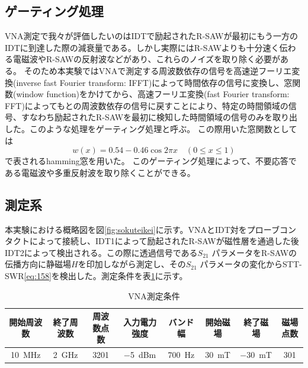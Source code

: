 \documentclass[dvipdfmx]{jsreport}
\numberwithin{equation}{chapter}
\numberwithin{table}{chapter}
\begin{document}
\subsection{ゲーティング処理}
VNA測定で我々が評価したいのはIDTで励起されたR-SAWが最初にもう一方のIDTに到達した際の減衰量である。しかし実際にはR-SAWよりも十分速く伝わる電磁波やR-SAWの反射波などがあり、これらのノイズを取り除く必要がある。
そのため本実験ではVNAで測定する周波数依存の信号を高速逆フーリエ変換(inverse fast Fourier transform: IFFT)によって時間依存の信号に変換し、窓関数(window function)をかけてから、高速フーリエ変換(fast Fourier transform: FFT)によってもとの周波数依存の信号に戻すことにより、特定の時間領域の信号、すなわち励起されたR-SAWを最初に検知した時間領域の信号のみを取り出した。このような処理をゲーティング処理と呼ぶ。
この際用いた窓関数としては
\begin{equation}
\label{eq:z6}
	w(x)=0.54-0.46 \cos 2\pi x\quad(0\le x\le 1)
\end{equation}
で表されるhamming窓を用いた。
このゲーティング処理によって、不要応答である電磁波や多重反射波を取り除くことができる。
\subsection{測定系}
本実験における概略図を図\ref{fig:sokuteikei}に示す。VNAとIDT対をプローブコンタクトによって接続し、IDT1によって励起されたR-SAWが磁性層を通過した後IDT2によって検出される。この際に透過信号である$S_{21}$ パラメータをR-SAWの伝播方向に静磁場$H$を印加しながら測定し、その$S_{21}$ パラメータの変化からSTT-SWR\eqref{eq:158}を検出した。測定条件を表\ref{tab:3}に示す。
\begin{table}[H]
	\centering
	\caption{VNA測定条件}
	\label{tab:3}
	\begin{tabular}{ccccc|ccc}\hline \hline
		開始周波数&終了周波数&周波数点数&入力電力強度&バンド幅&開始磁場&終了磁場&磁場点数\\ \hline 
		\SI{10}{\mega \hertz}&\SI{2}{\giga \hertz}&3201&\SI{-5}{dBm}&\SI{700}{\hertz}&\SI{30}{\milli \tesla}&\SI{-30}{\milli \tesla}&301\\\hline\hline
	\end{tabular}
\end{table}
\end{document}
